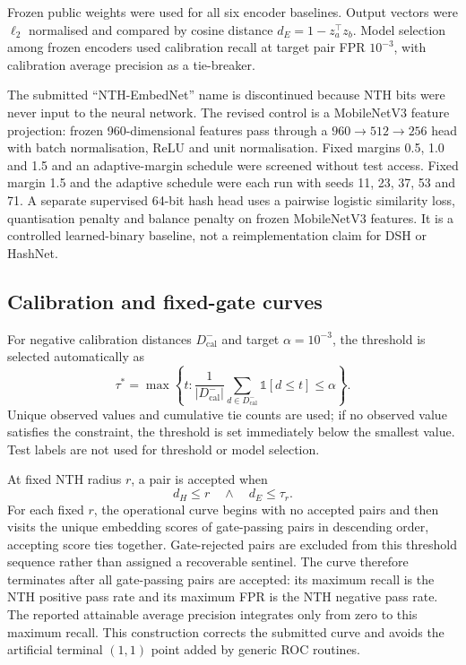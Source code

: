 \documentclass[12pt]{article}
\begin{document}
Frozen public weights were used for all six encoder baselines. Output vectors were $\ell_2$ normalised and compared by cosine distance $d_E=1-z_a^\top z_b$. Model selection among frozen encoders used calibration recall at target pair FPR $10^{-3}$, with calibration average precision as a tie-breaker.

The submitted ``NTH-EmbedNet'' name is discontinued because NTH bits were never input to the neural network. The revised control is a MobileNetV3 feature projection: frozen 960-dimensional features pass through a $960\rightarrow512\rightarrow256$ head with batch normalisation, ReLU and unit normalisation. Fixed margins 0.5, 1.0 and 1.5 and an adaptive-margin schedule were screened without test access. Fixed margin 1.5 and the adaptive schedule were each run with seeds 11, 23, 37, 53 and 71. A separate supervised 64-bit hash head uses a pairwise logistic similarity loss, quantisation penalty and balance penalty on frozen MobileNetV3 features. It is a controlled learned-binary baseline, not a reimplementation claim for DSH or HashNet.

\subsection{Calibration and fixed-gate curves}

For negative calibration distances $D^-_{\mathrm{cal}}$ and target $\alpha=10^{-3}$, the threshold is selected automatically as
\begin{equation}
 \tau^*=\max\left\{t:\frac{1}{|D^-_{\mathrm{cal}}|}\sum_{d\in D^-_{\mathrm{cal}}}\mathbb{1}[d\leq t]\leq\alpha\right\}.
\end{equation}
Unique observed values and cumulative tie counts are used; if no observed value satisfies the constraint, the threshold is set immediately below the smallest value. Test labels are not used for threshold or model selection.

At fixed NTH radius $r$, a pair is accepted when
\begin{equation}
  d_H\leq r\quad\land\quad d_E\leq\tau_r.
\end{equation}
For each fixed $r$, the operational curve begins with no accepted pairs and then visits the unique embedding scores of gate-passing pairs in descending order, accepting score ties together. Gate-rejected pairs are excluded from this threshold sequence rather than assigned a recoverable sentinel. The curve therefore terminates after all gate-passing pairs are accepted: its maximum recall is the NTH positive pass rate and its maximum FPR is the NTH negative pass rate. The reported attainable average precision integrates only from zero to this maximum recall. This construction corrects the submitted curve and avoids the artificial terminal $(1,1)$ point added by generic ROC routines.
\end{document}

